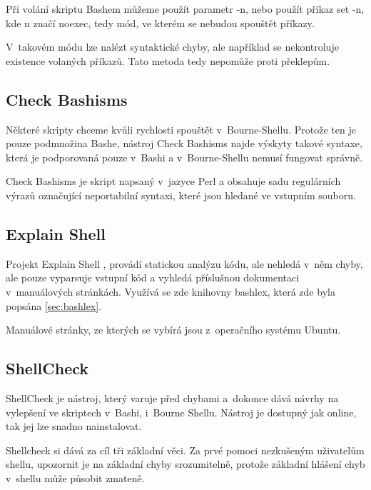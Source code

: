 \documentclass[thesis=M,czech]{FITthesis}[2012/06/26]
\begin{document}
Při volání skriptu Bashem můžeme použít parametr -n, nebo použít příkaz set -n, kde n značí noexec, tedy mód, ve kterém se nebudou spouštět příkazy.

V~takovém módu lze nalézt syntaktické chyby, ale například se nekontroluje existence volaných příkazů. Tato metoda  tedy nepomůže proti překlepům.


%
%
\subsection{Check Bashisms}

Některé skripty chceme kvůli rychlosti spouštět v~Bourne-Shellu. Protože ten je pouze podmnožina Bashe, nástroj Check Bashisms \cite{checkbaskisms} najde výskyty takové syntaxe, která je podporovaná pouze v~Bashi a v~Bourne-Shellu nemusí fungovat správně.

Check Bashisms je skript napsaný v~jazyce Perl \cite{perl} a obsahuje sadu regulárních výrazů označující neportabilní syntaxi, které jsou hledané ve vstupním souboru.



%
%
\subsection{Explain Shell}

Projekt Explain Shell \cite{explainshell}, provádí statickou analýzu kódu, ale nehledá v~něm chyby, ale pouze vyparsuje vstupní kód a vyhledá příslušnou dokumentaci v~manuálových stránkách. Využívá se zde knihovny bashlex, která zde byla popsána \ref{sec:bashlex}.

Manuálové stránky, ze kterých se vybírá jsou z~operačního systému Ubuntu.


%
%
\subsection{ShellCheck}

ShellCheck \cite{shellcheck} je nástroj, který varuje před chybami a~dokonce dává návrhy na vylepšení ve skriptech v~Bashi, i~Bourne Shellu. Nástroj je dostupný jak online, tak jej lze snadno nainstalovat.

Shellcheck si dává za cíl tři základní věci. Za prvé pomoci nezkušeným uživatelům shellu, upozornit je na základní chyby srozumitelně, protože základní hlášení chyb v~shellu může působit zmateně.
\end{document}
